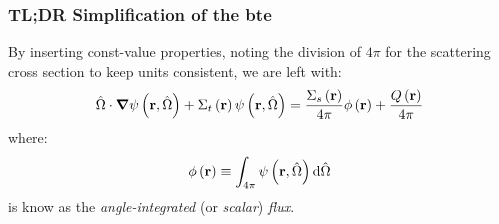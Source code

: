 

\begin{frame}
  \frametitle{TL;DR Simplification of the \gls{bte}}
  By inserting const-value properties, noting the division of $4\pi$ for the scattering cross section to keep units consistent, we are left with:
  \begin{equation} \label{eq:fully-simplified-bte}
    \hat{\Omega} \cdot \grad \psi\left(\mathbf{r},\hat{\Omega}\right) + \Sigma_t \left(\mathbf{r}\right)\psi\left(\mathbf{r},\hat{\Omega}\right) =\frac{\Sigma_s\left(\mathbf{r}\right)}{4\pi}\phi\left(\mathbf{r}\right) + \frac{Q\left(\mathbf{r}\right)}{4\pi}
  \end{equation}
  where:
  \begin{equation}
    \label{eq:scalar-flux}
    \phi\left(\mathbf{r}\right)\equiv \int_{4\pi}\psi \left(\mathbf{r},\hat{\Omega}\right) \dd \hat{\Omega}
  \end{equation}
   is know as the \textit{angle-integrated} (or \textit{scalar}) \textit{flux}.
\end{frame}